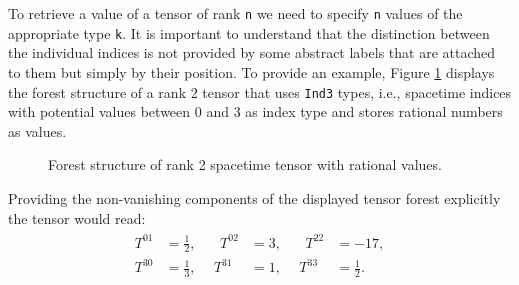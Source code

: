 \documentclass[a4paper,12pt, DIV=14, BCOR=5mm, twoside, headsepline, numbers=noenddot]{scrbook}
\begin{document}
To retrieve a value of a tensor of rank \texttt{n} we need to specify \texttt{n} values of the appropriate type \texttt{k}. It is important to understand that the distinction between the individual indices is not provided by some abstract labels that are attached to them but simply by their position. To provide an example, Figure \ref{ExampleTens} displays the forest structure of a rank $2$ tensor that uses \texttt{Ind3} types, i.e., spacetime indices with potential values between $0$ and $3$ as index type and stores rational numbers as values.
\begin{figure}[hbt!]
\centering
{}
\caption{Forest structure of rank 2 spacetime tensor with rational values.}\label{ExampleTens}
\end{figure}
Providing the non-vanishing components of the displayed tensor forest explicitly the tensor would read:
\begin{align}
\begin{alignedat}{3}
T^{01} &= \frac{1}{2}, \ \  &  \ \ T^{02} &= 3, \ \  & \ \ T^{22} &= -17,\\
T^{30} &= \frac{1}{3}, & T^{31} &= 1, & T^{33} &= \frac{1}{2}.
\end{alignedat}
\end{align}
\end{document}

